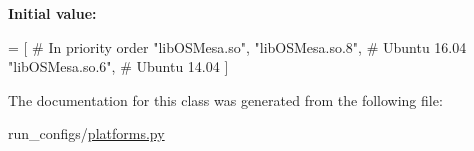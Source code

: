 {\bfseries Initial value\+:}
\begin{DoxyCode}
=  [  \textcolor{comment}{# In priority order}
      \textcolor{stringliteral}{"libOSMesa.so"},
      \textcolor{stringliteral}{"libOSMesa.so.8"},  \textcolor{comment}{# Ubuntu 16.04}
      \textcolor{stringliteral}{"libOSMesa.so.6"},  \textcolor{comment}{# Ubuntu 14.04}
  ]
\end{DoxyCode}


The documentation for this class was generated from the following file\+:\begin{DoxyCompactItemize}
\item 
run\+\_\+configs/\mbox{\hyperlink{platforms_8py}{platforms.\+py}}\end{DoxyCompactItemize}
